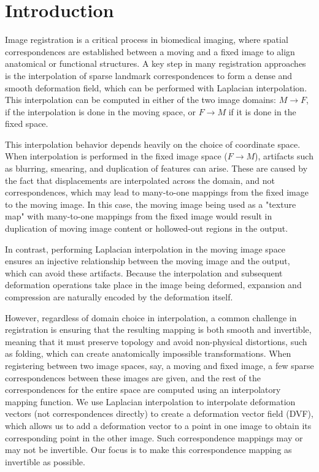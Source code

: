 
\section{Introduction}

Image registration is a critical process in biomedical imaging, where spatial correspondences are established between a moving and a fixed image to align anatomical or functional structures. A key step in many registration approaches is the interpolation of sparse landmark correspondences to form a dense and smooth deformation field, which can be performed with Laplacian interpolation. This interpolation can be computed in either of the two image domains: $M\rightarrow F$, if the interpolation is done in the moving space, or $F\rightarrow M$ if it is done in the fixed space.

This interpolation behavior depends heavily on the choice of coordinate space. When interpolation is performed in the fixed image space ($F\rightarrow M$), artifacts such as blurring, smearing, and duplication of features can arise. These are caused by the fact that displacements are interpolated across the domain, and not correspondences, which may lead to many-to-one mappings from the fixed image to the moving image. In this case, the moving image being used as a "texture map" with many-to-one mappings from the fixed image would result in duplication of moving image content or hollowed-out regions in the output.

In contrast, performing Laplacian interpolation in the moving image space ensures an injective relationship between the moving image and the output, which can avoid these artifacts. Because the interpolation and subsequent deformation operations take place in the image being deformed, expansion and compression are naturally encoded by the deformation itself.

However, regardless of domain choice in interpolation, a common challenge in registration is ensuring that the resulting mapping is both smooth and invertible, meaning that it must preserve topology and avoid non-physical distortions, such as folding, which can create anatomically impossible transformations. When registering between two image spaces, say, a moving and fixed image, a few sparse correspondences between these images are given, and the rest of the correspondences for the entire space are computed using an interpolatory mapping function. We use Laplacian interpolation to interpolate deformation vectors (not correspondences directly) to create a deformation vector field (DVF), which allows us to add a deformation vector to a point in one image to obtain its corresponding point in the other image. Such correspondence mappings may or may not be invertible. Our focus is to make this correspondence mapping as invertible as possible. 

